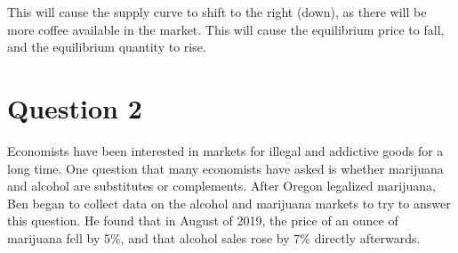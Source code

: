 \documentclass{article}
\newcommand{\question}[1]{\pagebreak\section{Question #1}}
\begin{document}
\begin{enumerate}[(a)]
    This will cause the supply curve to shift to the right (down), as there will be more coffee available in the market. This will cause the equilibrium price to fall, and the equilibrium quantity to rise.

\end{enumerate}

\pagebreak

\question{2}

Economists have been interested in markets for illegal and addictive goods for a long time. One question that many economists have asked is whether \textcolor{OliveGreen}{marijuana} and alcohol are substitutes or complements. After Oregon legalized \textcolor{OliveGreen}{marijuana}, Ben began to collect data on the alcohol and \textcolor{OliveGreen}{marijuana} markets to try to answer this question. He found that in August of 2019, the price of an ounce of \textcolor{OliveGreen}{marijuana} fell by 5\%, and that alcohol sales rose by 7\% directly afterwards.
\end{document}
